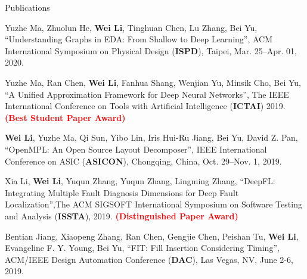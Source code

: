 \begin{rSection}{Publications}
\begin{description}[font=\normalfont]
{}
\item[{[C5]}]{
    Yuzhe Ma, Zhuolun He, \textbf{Wei Li}, Tinghuan Chen, Lu Zhang, Bei Yu, 
    ``Understanding Graphs in EDA: From Shallow to Deep Learning'', ACM International Symposium on Physical Design (\textbf{ISPD}), Taipei, Mar. 25–Apr. 01, 2020.
}
\item[{[C4]}]{
    Yuzhe Ma, Ran Chen, \textbf{Wei Li}, Fanhua Shang, Wenjian Yu, Minsik Cho, Bei Yu, 
    ``A Unified Approximation Framework for Deep Neural Networks'', The IEEE International Conference on Tools with Artificial Intelligence (\textbf{ICTAI}) 2019. \textcolor{red}{\textbf{(Best Student Paper Award)}}
}
\item[{[C3]}]{
    \textbf{Wei Li}, Yuzhe Ma, Qi Sun, Yibo Lin, Iris Hui-Ru Jiang, Bei Yu, David Z. Pan,
    ``OpenMPL: An Open Source Layout Decomposer'', IEEE International Conference on ASIC (\textbf{ASICON}), Chongqing, China, Oct. 29–Nov. 1, 2019. 
}
\item[{[C2]}]{
    Xia Li, \textbf{Wei Li}, Yuqun Zhang, Yuqun Zhang, Lingming Zhang, 
    ``DeepFL: Integrating Multiple Fault Diagnosis Dimensions for Deep Fault Localization'',The ACM SIGSOFT International Symposium on Software Testing and Analysis 
      (\textbf{ISSTA}), 2019. \textcolor{red}{\textbf{(Distinguished Paper Award)}}
}
\item[{[C1]}]{
    Bentian Jiang, Xiaopeng Zhang, Ran Chen, Gengjie Chen, Peishan Tu, \textbf{Wei Li}, Evangeline F. Y. Young, Bei Yu, 
    ``FIT: Fill Insertion Considering Timing'', 
    ACM/IEEE Design Automation Conference (\textbf{DAC}), Las Vegas, NV, June 2-6, 2019.
}


\end{description}


\end{rSection}


